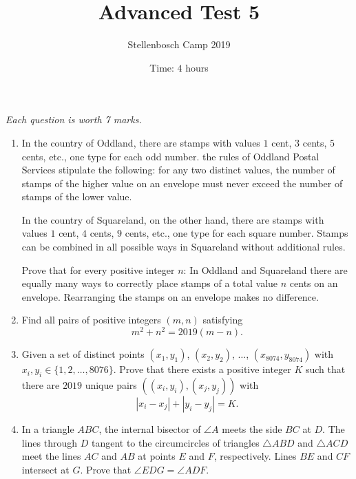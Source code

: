 \documentclass{article}
\title{Advanced Test 5}
\author{Stellenbosch Camp 2019}
\date{Time: $4$ hours}
\begin{document}
\maketitle
\thispagestyle{empty}

\hfill\textit{Each question is worth 7 marks.}

\vfill
\vfill


\begin{enumerate}[1.]

\item %
In the country of Oddland, there are stamps with values $1$ cent, $3$ cents, $5$ cents, etc., one type for each odd number.
the rules of Oddland Postal Services stipulate the following: for any two distinct values, the number of stamps of the higher value on an envelope must never exceed the number of stamps of the lower value.

In the country of Squareland, on the other hand, there are stamps with values $1$ cent, $4$ cents, $9$ cents, etc., one type for each square number.
Stamps can be combined in all possible ways in Squareland without additional rules.

Prove that for every positive integer $n$:
In Oddland and Squareland there are equally many ways to correctly place stamps of a total value $n$ cents on an envelope.
Rearranging the stamps on an envelope makes no difference.


\vfill

\item %
Find all pairs of positive integers $(m,n)$ satisfying
\[ m^2 +n^2 = 2019(m-n). \]


\vfill

\item %
Given a set of distinct points $(x_1, y_1)$, $(x_2, y_2)$, $\dots$, $(x_{8074}, y_{8074})$ with $x_i, y_i \in \{1, 2, \dots, 8076\}$.
Prove that there exists a positive integer $K$ such that there are $2019$ unique pairs $( (x_i, y_i), (x_j, y_j) )$ with
\[ |x_i - x_j| + |y_i - y_j| = K. \]


\vfill

\item %
In a triangle $ABC$, the internal bisector of $\angle A$ meets the side $BC$ at $D$.
The lines through $D$ tangent to the circumcircles of triangles $\triangle ABD$ and $\triangle ACD$ meet the lines $AC$ and $AB$ at points $E$ and $F$, respectively.
Lines $BE$ and $CF$ intersect at $G$.
Prove that $\angle EDG = \angle ADF$.



\end{enumerate}
\end{document}
